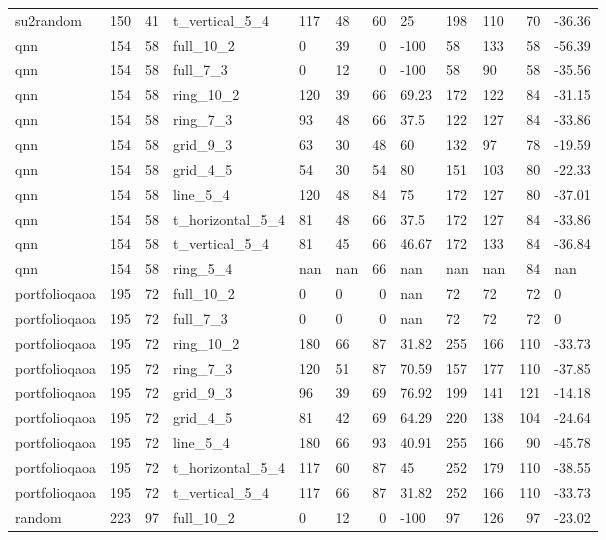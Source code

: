 \begin{longtable}{lrrlllrlllrl}
su2random & 150 & 41 & t\_vertical\_5\_4 & 117 & 48 & 60 & 25 & 198 & 110 & 70 & -36.36 \\
qnn & 154 & 58 & full\_10\_2 & 0 & 39 & 0 & -100 & 58 & 133 & 58 & -56.39 \\
qnn & 154 & 58 & full\_7\_3 & 0 & 12 & 0 & -100 & 58 & 90 & 58 & -35.56 \\
qnn & 154 & 58 & ring\_10\_2 & 120 & 39 & 66 & 69.23 & 172 & 122 & 84 & -31.15 \\
qnn & 154 & 58 & ring\_7\_3 & 93 & 48 & 66 & 37.5 & 122 & 127 & 84 & -33.86 \\
qnn & 154 & 58 & grid\_9\_3 & 63 & 30 & 48 & 60 & 132 & 97 & 78 & -19.59 \\
qnn & 154 & 58 & grid\_4\_5 & 54 & 30 & 54 & 80 & 151 & 103 & 80 & -22.33 \\
qnn & 154 & 58 & line\_5\_4 & 120 & 48 & 84 & 75 & 172 & 127 & 80 & -37.01 \\
qnn & 154 & 58 & t\_horizontal\_5\_4 & 81 & 48 & 66 & 37.5 & 172 & 127 & 84 & -33.86 \\
qnn & 154 & 58 & t\_vertical\_5\_4 & 81 & 45 & 66 & 46.67 & 172 & 133 & 84 & -36.84 \\
qnn & 154 & 58 & ring\_5\_4 & nan & nan & 66 & nan & nan & nan & 84 & nan \\
portfolioqaoa & 195 & 72 & full\_10\_2 & 0 & 0 & 0 & nan & 72 & 72 & 72 & 0 \\
portfolioqaoa & 195 & 72 & full\_7\_3 & 0 & 0 & 0 & nan & 72 & 72 & 72 & 0 \\
portfolioqaoa & 195 & 72 & ring\_10\_2 & 180 & 66 & 87 & 31.82 & 255 & 166 & 110 & -33.73 \\
portfolioqaoa & 195 & 72 & ring\_7\_3 & 120 & 51 & 87 & 70.59 & 157 & 177 & 110 & -37.85 \\
portfolioqaoa & 195 & 72 & grid\_9\_3 & 96 & 39 & 69 & 76.92 & 199 & 141 & 121 & -14.18 \\
portfolioqaoa & 195 & 72 & grid\_4\_5 & 81 & 42 & 69 & 64.29 & 220 & 138 & 104 & -24.64 \\
portfolioqaoa & 195 & 72 & line\_5\_4 & 180 & 66 & 93 & 40.91 & 255 & 166 & 90 & -45.78 \\
portfolioqaoa & 195 & 72 & t\_horizontal\_5\_4 & 117 & 60 & 87 & 45 & 252 & 179 & 110 & -38.55 \\
portfolioqaoa & 195 & 72 & t\_vertical\_5\_4 & 117 & 66 & 87 & 31.82 & 252 & 166 & 110 & -33.73 \\
random & 223 & 97 & full\_10\_2 & 0 & 12 & 0 & -100 & 97 & 126 & 97 & -23.02 \\

\end{longtable}
